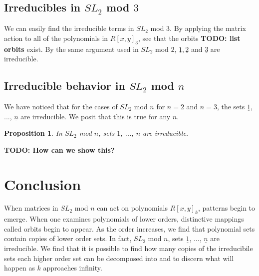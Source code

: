 \documentclass[a4paper,draft]{amsproc}
\theoremstyle{plain}
\newtheorem{prop}{Proposition}[section]
\theoremstyle{definition}
\theoremstyle{remark}
\numberwithin{equation}{section}
\begin{document}
\subsection{Irreducibles in $SL_{2}$ mod $3$}
We can easily find the irreducible terms in $SL_{2}$ mod $3$. By applying the matrix action to all of the polynomials in  $R[x,y]_{3}$, see that the orbits \textbf{TODO: list orbits} exist. By the same argument used in $SL_{2}$ mod $2$, $\underline{1}, \underline{2}$ and $\underline{3}$ are irreducible. 

\subsection{Irreducible behavior in $SL_{2}$ mod $n$}
We have noticed that for the cases of $SL_{2}$ mod $n$ for $n = 2$ and $n = 3$, the sets $\underline{1}$, ..., $\underline{n}$ are irreducible. We posit that this is true for any $n$. 
\begin{prop}
 In $SL_{2}$ mod $n$, sets $\underline{1}$, ..., $\underline{n}$ are irreducible. 
\end{prop}
\textbf{TODO: How can we show this?}

\section{Conclusion}
When matrices in $SL_{2}$ mod $n$ can act on polynomials $R[x,y]_{k}$, patterns begin to emerge. When one examines polynomials of lower orders, distinctive mappings called orbits begin to appear. As the order increases, we find that polynomial sets contain copies of lower order sets.  In fact, $SL_{2}$ mod $n$, sets $\underline{1}$, ..., $\underline{n}$ are irreducible. We find that it is possible to find how many copies of the irreducibile sets each higher order set can be decomposed into and to discern what will happen as $k$ approaches infinity.

\end{document}
